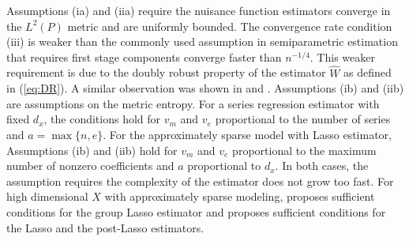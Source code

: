 \documentclass[12pt,oneside,reqno,english]{amsart}
\theoremstyle{definition}
\begin{document}
Assumptions (ia) and (iia) require the nuisance function estimators converge in 
the $L^{2}(P)$ metric and are uniformly bounded. 
The convergence rate condition (iii) is weaker than the commonly used assumption in semiparametric estimation
that requires first stage components converge faster than $n^{-1/4}$. 
This weaker requirement is due to the doubly robust property of the estimator $\hat{W}$ as defined in (\ref{eq:DR}). 
A similar observation was shown in \cite{Farrell:15} and \cite{RF:18}. 
Assumptions (ib) and (iib) are assumptions on the metric entropy. For a series regression estimator with fixed $d_{x}$, the conditions hold for $v_{m}$ and $v_{e}$ proportional to the number of series and $a=\max\{n,e\}$. For the approximately sparse model with Lasso estimator, Assumptions (ib) and (iib) hold for $v_{m}$ and $v_{e}$ proportional to the maximum number of nonzero coefficients and $a$ proportional to $d_{x}$. In both cases, the assumption requires the complexity of the estimator does not grow too fast. 
For high dimensional $X$ with approximately sparse modeling, \cite{Farrell:15} proposes sufficient conditions for the group Lasso estimator and \cite{BCFH:17} proposes sufficient conditions for the Lasso and the post-Lasso estimators. 
 
\end{document}
